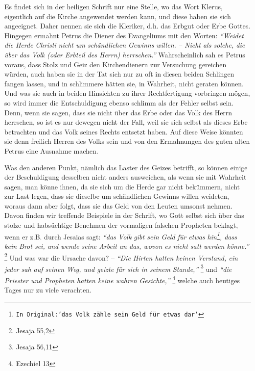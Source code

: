 Es findet sich in der heiligen Schrift nur eine Stelle, wo das Wort
Klerus,
eigentlich auf die Kirche angewendet werden kann, und diese haben sie sich
angeeignet. Daher nennen sie sich die Kleriker, d.h. das Erbgut oder Erbe
Gottes. Hingegen ermahnt Petrus die Diener des
Evangeliums mit den Worten:
\textit{"`Weidet die Herde Christi nicht um schändlichen Gewinns willen. --
Nicht
als solche, die über das Volk (oder Erbteil des Herrn) herrschen."'}
Wahrscheinlich sah es Petrus voraus, dass Stolz und Geiz den Kirchendienern zur
Versuchung gereichen würden, auch haben sie in der Tat sich nur zu oft in
diesen beiden Schlingen fangen lassen, und in schlimmere hätten sie, in
Wahrheit, nicht geraten können. Und was sie auch in beiden Hinsichten zu ihrer
Rechtfertigung vorbringen mögen, so wird immer die Entschuldigung ebenso
schlimm als der Fehler selbst sein. Denn, wenn sie sagen, dass sie nicht über das
Erbe oder das Volk des Herrn herrschen, so ist es nur dewegen nicht der Fall,
weil sie sich selbst als dieses Erbe betrachten und das Volk seines Rechts
entsetzt haben. Auf diese Weise könnten sie denn freilich Herren des Volks sein
und von den Ermahnungen des guten alten Petrus eine Ausnahme machen.

\medskip

Was den anderen Punkt, nämlich das Laster des Geizes
betrifft, so können einige
der Beschuldigung desselben nicht anders ausweichen, als wenn sie mit Wahrheit
sagen, man könne ihnen, da sie sich um die Herde gar nicht bekümmern, nicht zur
Last legen, dass sie dieselbe um schändlichen Gewinns willen weideten, woraus
dann aber folgt, dass sie das Geld von den Leuten umsonst nehmen. Davon finden
wir treffende Beispiele in der Schrift, wo Gott selbst sich über das stolze und
habsüchtige Benehmen der vormaligen falschen Propheten beklagt, wenn er z.B.
durch Jesaias sagt:
\textit{"`das Volk gibt sein Geld für etwas hin\footnote{\texttt{In Original:'das Volk zähle sein Geld für etwas dar'}},
dass kein Brot sei,
und wende seine Arbeit an das, wovon es nicht satt werden könne."'}
\footnote{Jesaja 55,2}
Und was war die Ursache davon? --
\textit{"`Die Hirten hatten keinen Verstand, ein
jeder sah auf seinen Weg, und geizte für sich in seinem Stande,"'}
\footnote{Jesaja 56,11}
 und
\textit{"`die Priester und Propheten hatten keine wahren
Gesichte,"'}
\footnote{Ezechiel 13}
welche auch heutiges Tages nur zu viele
verachten.

